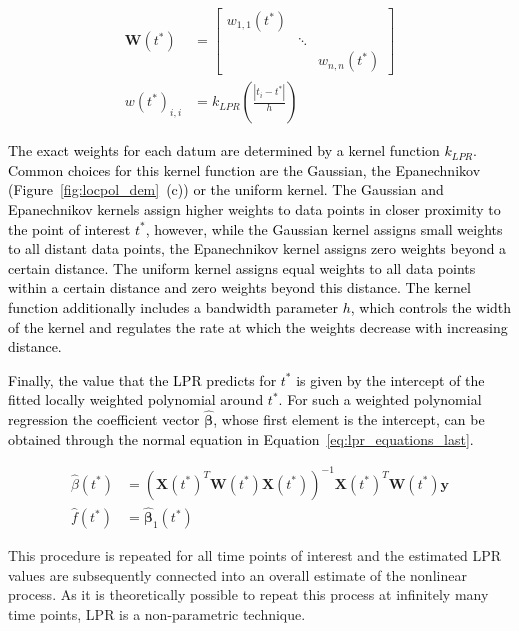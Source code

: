 \documentclass[man, floatsintext]{apa7}
\begin{document}
\begin{align}
  \textbf{W}(t^*) & =
  \begin{bmatrix}
    w_{1, 1}(t^*) &        &               \\
                  & \ddots &               \\
                  &        & w_{n, n}(t^*)
  \end{bmatrix}               \\
  w(t^*)_{i, i}   & = k_{LPR}(\frac{|t_i - t^*|}{h})
  \label{eq:lpr_equations_weights}
\end{align}

\noindent\textcolor{black}{ The exact weights for each datum are determined by
  a
  kernel function $k_{LPR}$. Common choices for this kernel function are the
  Gaussian, the Epanechnikov (Figure~\ref{fig:locpol_dem}~(c)) or the uniform
  kernel. The Gaussian and Epanechnikov kernels assign higher weights to data
  points in closer proximity
  to the point of interest $t^*$, however, while the Gaussian kernel assigns
  small weights to all distant data points, the Epanechnikov kernel assigns
  zero weights beyond a certain distance. The uniform kernel assigns equal
  weights to all data points within a certain distance and zero weights
  beyond this distance. The kernel function additionally
  includes a bandwidth parameter $h$, which controls the width of the kernel
  and regulates the rate at which the weights decrease with increasing
  distance. }

\textcolor{black}{
  Finally, the value that the LPR predicts for $t^*$ is given by the intercept
  of the fitted locally weighted polynomial around $t^*$. For such a weighted
  polynomial regression the coefficient vector
}$\hat{\boldsymbol{\beta}}$\textcolor{black}{, whose first element is the
  intercept, can be obtained through the normal equation in
  Equation~\ref{eq:lpr_equations_last}.
}

\begin{align}
  \hat{\beta}(t^*) & =
  (\textbf{X}(t^*)^T\textbf{W}(t^*)\textbf{X}(t^*))^{-1}
  \textbf{X}(t^*)^T\textbf{W}(t^*)\textbf{y}
  \label{eq:lpr_equations_last}                \\
  \hat{f}(t^*)     & = \hat{\bm{\beta}}_1(t^*)
\end{align}

This procedure is repeated for all
time points of interest and the estimated LPR values are subsequently connected
into an overall estimate of the nonlinear process.
As it is theoretically possible to repeat this process at infinitely many
time points, LPR is a non-parametric technique.
\end{document}
